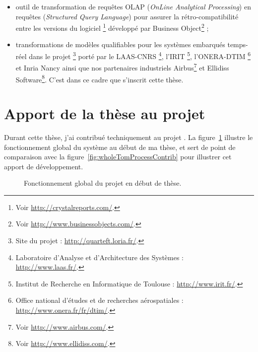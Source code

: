 \begin{itemize}
  \item outil de transformation de requêtes OLAP (\emph{OnLine Analytical
    Processing}) en requêtes {\sql} (\emph{Structured Query Language}) pour
    assurer la rétro-compatibilité entre les versions du logiciel
    {\crystalreports}\footnote{Voir \url{http://crystalreports.com/}.} développé par
    Business Object\footnote{Voir \url{http://www.businessobjects.com/}.} ;
    
  \item transformations de modèles qualifiables pour les systèmes embarqués
  temps-réel dans le projet
{\quarteft}\footnote{Site du projet : \url{http://quarteft.loria.fr/}.} porté par le LAAS-CNRS
\footnote{Laboratoire d'Analyse et d'Architecture des Systèmes :
  \url{http://www.laas.fr/}.}, l'IRIT \footnote{Institut de Recherche en
  Informatique de Toulouse : \url{http://www.irit.fr/}.}, l'ONERA-DTIM
  \footnote{Office national d'études et de recherches aérospatiales :
    \url{http://www.onera.fr/fr/dtim/}.} et Inria Nancy ainsi que nos partenaires
    industriels Airbus\footnote{Voir \url{http://www.airbus.com/}.} et Ellidiss
    Software\footnote{Voir \url{http://www.ellidiss.com/}.}. C'est dans ce cadre que
    s'inscrit cette thèse.

\end{itemize}

\index{\tom|)}



\section{Apport de la thèse au projet {\tom}}
\label{sec:contrib}

Durant cette thèse, j'ai contribué techniquement au projet {\tom}. La
figure~\ref{fig:wholeTomProcessBeforeThesis} illustre le fonctionnement global
du système {\tom} au début de ma thèse, et sert de point de comparaison avec la
figure~\ref{fig:wholeTomProcessContrib} pour illustrer cet apport de
développement. 

\begin{figure}[h]
  \begin{center}
    
  \end{center}
  \caption{Fonctionnement global du projet {\tom} en début de thèse.}
  \label{fig:wholeTomProcessBeforeThesis}
\end{figure}


